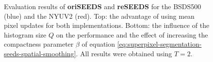 \begin{figure}[t]
%				
	\caption[Evaluation results of several implementations and variants of \textbf{SEEDS} \cite{VanDenBerghBoixRoigCapitaniVanGool:2012} obtained on the validation set of the Berkeley Segmentation Dataset \cite{ArbelaezMaireFowlkesMalik:2011} and the training set of the NYU Depth Dataset \cite{SilbermanHoiemKohliFergus:2012}.]{Evaluation results of \textbf{oriSEEDS} and \textbf{reSEEDS} for the BSDS500 (blue) and the NYUV2 (red). Top: the advantage of using mean pixel updates for both implementations. Bottom: the influence of the histogram size $Q$ on the performance and the effect of increasing the compactness parameter $\beta$ of equation \eqref{eq:superpixel-segmentation-seeds-spatial-smoothing}. All results were obtained using $T = 2$.}
	\label{fig:evaluation-seeds}
\end{figure}

